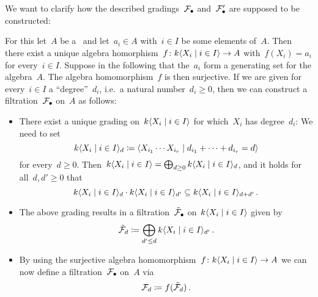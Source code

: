 \section{}





\addtocounter{subsection}{1}





\subsection{}

We want to clarify how the described gradings~$\mathcal{F}_\bullet$ and~$\mathcal{F}'_\bullet$ are supposed to be constructed:

For this let~$A$ be a~{\kalg} and let~$a_i \in A$ with~$i \in I$ be some elements of~$A$.
Then there exist a unique algebra homorphism~$f \colon k\gen{X_i \suchthat i \in I} \to A$ with~$f(X_i) = a_i$ for every~$i \in I$.
Suppose in the following that the~$a_i$ form a generating set for the algebra~$A$.
The algebra homomorphism~$f$ is then surjective.
If we are given for every~$i \in I$ a \enquote{degree}~$d_i$, i.e.\ a natural number~$d_i \geq 0$, then we can construct a filtration~$\mathcal{F}_\bullet$ on~$A$ as follows:

\begin{itemize}
  \item
    There exist a unique grading on~$k\gen{X_i \suchthat i \in I}$ for which~$X_i$ has degree~$d_i$:
    We need to set
    \[
        k\gen{X_i \suchthat i \in I}_d
      \defined
        \gen{
          X_{i_1} \dotsm X_{i_r}
        \suchthat
          d_{i_1} + \dotsb + d_{i_r} = d
        }
    \]
    for every~$d \geq 0$.
    Then~$k\gen{X_i \suchthat i \in I} = \bigoplus_{d \geq 0} k\gen{X_i \suchthat i \in I}_d$, and it holds for all~$d, d' \geq 0$ that
    \[
        k\gen{X_i \suchthat i \in I}_d
        \cdot
        k\gen{X_i \suchthat i \in I}_{d'}
      \subseteq
        k\gen{X_i \suchthat i \in I}_{d+d'} \,.
    \]
  \item
    The above grading results in a filtration~$\tilde{\mathcal{F}}_\bullet$ on~$k\gen{X_i \suchthat i \in I}$ given by
    \[
                \tilde{\Fcal}_d
      \defined  \bigoplus_{d' \leq d} k\gen{X_i \suchthat i \in I}_{d'} \,.
    \]
  \item
    By using the surjective algebra homomorphism~$f \colon k\gen{X_i \suchthat i \in I} \to A$ we can now define a filtration~$\mathcal{F}_\bullet$ on~$A$ via
    \[
                \mathcal{F}_d
      \coloneqq  f( \tilde{\mathcal{F}}_d ) \,.
    \]
\end{itemize}

